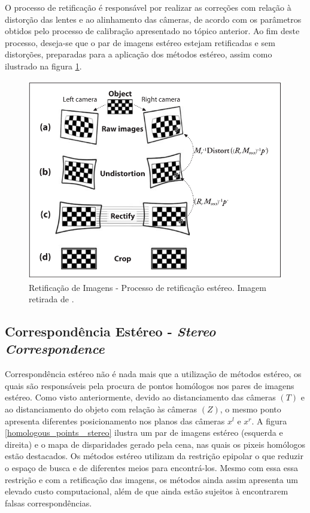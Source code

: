 O processo de retificação é responsável por realizar as correções com relação à distorção das lentes e ao alinhamento das câmeras, de acordo com os parâmetros obtidos pelo processo de calibração apresentado no tópico anterior. Ao fim deste processo, deseja-se que o par de imagens estéreo estejam retificadas e sem distorções, preparadas para a aplicação dos métodos estéreo, assim como ilustrado na figura \ref{rectification_process}.

\begin{figure}[H]
 	\centering
 	\includegraphics[scale=0.32]{./Resources/bradski/rectification_process.png}
 	\caption{Retificação de Imagens - Processo de retificação estéreo. Imagem retirada de \cite{Bradski2008}.}
 	\label{rectification_process}
\end{figure}


\subsection{Correspondência Estéreo - \textit{Stereo Correspondence}}

Correspondência estéreo não é nada mais que a utilização de métodos estéreo, os quais são responsáveis pela procura de pontos homólogos nos pares de imagens estéreo. Como visto anteriormente, devido ao distanciamento das câmeras $(T)$ e ao distanciamento do objeto com relação às câmeras $(Z)$, o mesmo ponto apresenta diferentes posicionamento nos planos das câmeras $x^l$ e $x^r$. A figura \ref{homologous_points _stereo} ilustra um par de imagens estéreo (esquerda e direita) e o mapa de disparidades gerado pela cena, nas quais os pixeis homólogos estão destacados. Os métodos estéreo utilizam da restrição epipolar o que reduzir o espaço de busca e de diferentes meios para encontrá-los. Mesmo com essa essa restrição e com a retificação das imagens, os métodos ainda assim apresenta um elevado custo computacional, além de que ainda estão sujeitos à encontrarem falsas correspondências. 

